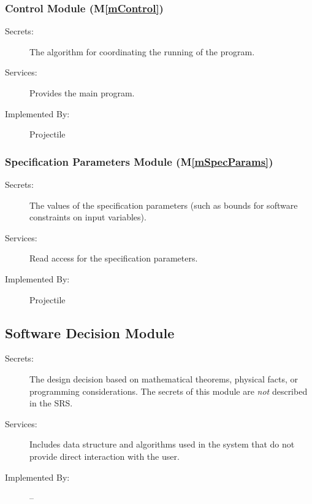 \documentclass[12pt]{article}
\newcommand{\mref}[1]{M\ref{#1}}
\begin{document}
%

\subsubsection{Control Module (\mref{mControl})}

\begin{description}
\item[Secrets:] The algorithm for coordinating the running of the program.
\item[Services:] Provides the main program.
\item[Implemented By:] Projectile
\end{description}
 
\subsubsection{Specification Parameters Module (\mref{mSpecParams})}

\begin{description}
\item[Secrets:] The values of the specification parameters (such as bounds for
  software constraints on input variables).
\item[Services:] Read access for the specification parameters.
\item[Implemented By:] Projectile
\end{description}

\subsection{Software Decision Module}

\begin{description}
\item[Secrets:] The design decision based on mathematical theorems, physical
  facts, or programming considerations. The secrets of this module are
  \emph{not} described in the SRS.
\item[Services:] Includes data structure and algorithms used in the system that
  do not provide direct interaction with the user. 
\item[Implemented By:] --
\end{description}
\end{document}
